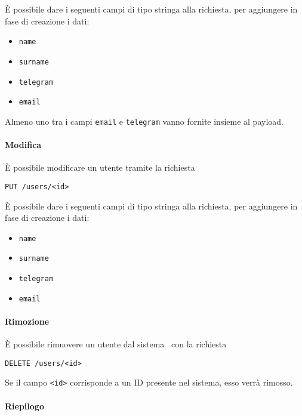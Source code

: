 È possibile dare i seguenti campi di tipo stringa alla richiesta, per aggiungere in fase di creazione i dati:
\begin{itemize}[noitemsep]
    \item \texttt{name}
    \item \texttt{surname}
    \item \texttt{telegram}
    \item \texttt{email}
\end{itemize}
Almeno uno tra i campi \texttt{email} e \texttt{telegram} vanno fornite insieme al payload.

\paragraph{Modifica}

È possibile modificare un utente tramite la richiesta
\begin{center}
    \texttt{PUT /users/<id>}
\end{center}
È possibile dare i seguenti campi di tipo stringa alla richiesta, per aggiungere in fase di creazione i dati:
\begin{itemize}[noitemsep]
    \item \texttt{name}
    \item \texttt{surname}
    \item \texttt{telegram}
    \item \texttt{email}
\end{itemize}


\paragraph{Rimozione}

È possibile rimuovere un utente dal sistema \progetto\ con la richiesta
\begin{center}
    \texttt{DELETE /users/<id>}
\end{center}

Se il campo \texttt{<id>} corrisponde a un ID presente nel sistema, esso verrà rimosso.


\paragraph{Riepilogo}

